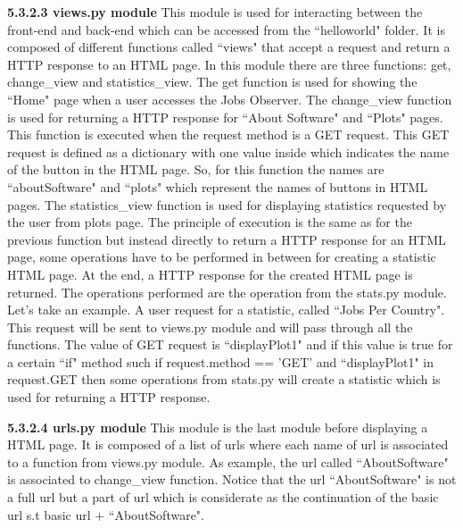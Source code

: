 \documentclass[conference,compsoc]{IEEEtran}
\begin{document}
\noindent
\newline\newline
\textbf{5.3.2.3 views.py module}
\newline\newline
This module is used for interacting between the front-end and back-end which can be accessed from the ``helloworld" folder. It is composed of different functions called ``views" that accept a request and return a HTTP response to an HTML page. In this module there are three functions: get, change\_view and statistics\_view. 
\newline                                                                                                                                       
The get function is used for showing the ``Home" page when a user accesses the Jobs Observer.
\newline
The change\_view function is used for returning a HTTP response for ``About Software" and ``Plots" pages. This function is executed when the request method is a GET request. This GET request is defined as a dictionary with one value inside which indicates the name of the button in the HTML page. So, for this function the names are ``aboutSoftware" and ``plots" which represent the names of buttons in HTML pages.    
\newline
The statistics\_view function is used for displaying statistics requested by the user from plots page. The principle of execution is the same as for the previous function but instead directly to return a HTTP response for an HTML page, some operations have to be performed in between for creating a statistic HTML page. 
\newline
At the end, a HTTP response for the created HTML page is returned. The operations performed are the operation from the stats.py module. Let's take an example. 
\newline
A user request for a statistic, called ``Jobs Per Country". This request will be sent to views.py module and will pass through all the functions. The value of GET request is ``displayPlot1" and if this value is true for a certain ``if" method such if request.method == 'GET' and ``displayPlot1" in request.GET then some operations from stats.py will create a statistic which is used for returning a HTTP response. 

\noindent
\newline\newline
\textbf{5.3.2.4 urls.py module}
\newline\newline
This module is the last module before displaying a HTML page. It is composed of a list of urls where each name of url is associated to a function from views.py module. 
\newline
As example, the url called ``AboutSoftware" is associated to change\_view function.  Notice that the url ``AboutSoftware" is not a full url but a part of url which is considerate as the continuation of the basic url s.t basic url $+$ ``AboutSoftware".
\end{document}
